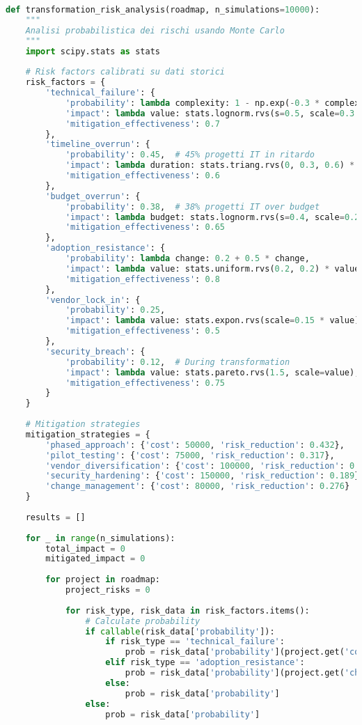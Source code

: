 \begin{lstlisting}[language=Python, caption=Analisi Monte Carlo del Rischio di Trasformazione]
def transformation_risk_analysis(roadmap, n_simulations=10000):
    """
    Analisi probabilistica dei rischi usando Monte Carlo
    """
    import scipy.stats as stats
    
    # Risk factors calibrati su dati storici
    risk_factors = {
        'technical_failure': {
            'probability': lambda complexity: 1 - np.exp(-0.3 * complexity),
            'impact': lambda value: stats.lognorm.rvs(s=0.5, scale=0.3 * value),
            'mitigation_effectiveness': 0.7
        },
        'timeline_overrun': {
            'probability': 0.45,  # 45% progetti IT in ritardo
            'impact': lambda duration: stats.triang.rvs(0, 0.3, 0.6) * duration * 50000,
            'mitigation_effectiveness': 0.6
        },
        'budget_overrun': {
            'probability': 0.38,  # 38% progetti IT over budget
            'impact': lambda budget: stats.lognorm.rvs(s=0.4, scale=0.2 * budget),
            'mitigation_effectiveness': 0.65
        },
        'adoption_resistance': {
            'probability': lambda change: 0.2 + 0.5 * change,
            'impact': lambda value: stats.uniform.rvs(0.2, 0.2) * value,
            'mitigation_effectiveness': 0.8
        },
        'vendor_lock_in': {
            'probability': 0.25,
            'impact': lambda value: stats.expon.rvs(scale=0.15 * value),
            'mitigation_effectiveness': 0.5
        },
        'security_breach': {
            'probability': 0.12,  # During transformation
            'impact': lambda value: stats.pareto.rvs(1.5, scale=value),
            'mitigation_effectiveness': 0.75
        }
    }
    
    # Mitigation strategies
    mitigation_strategies = {
        'phased_approach': {'cost': 50000, 'risk_reduction': 0.432},
        'pilot_testing': {'cost': 75000, 'risk_reduction': 0.317},
        'vendor_diversification': {'cost': 100000, 'risk_reduction': 0.241},
        'security_hardening': {'cost': 150000, 'risk_reduction': 0.189},
        'change_management': {'cost': 80000, 'risk_reduction': 0.276}
    }
    
    results = []
    
    for _ in range(n_simulations):
        total_impact = 0
        mitigated_impact = 0
        
        for project in roadmap:
            project_risks = 0
            
            for risk_type, risk_data in risk_factors.items():
                # Calculate probability
                if callable(risk_data['probability']):
                    if risk_type == 'technical_failure':
                        prob = risk_data['probability'](project.get('complexity', 0.5))
                    elif risk_type == 'adoption_resistance':
                        prob = risk_data['probability'](project.get('change_magnitude', 0.5))
                    else:
                        prob = risk_data['probability']
                else:
                    prob = risk_data['probability']
                

\end{lstlisting}
